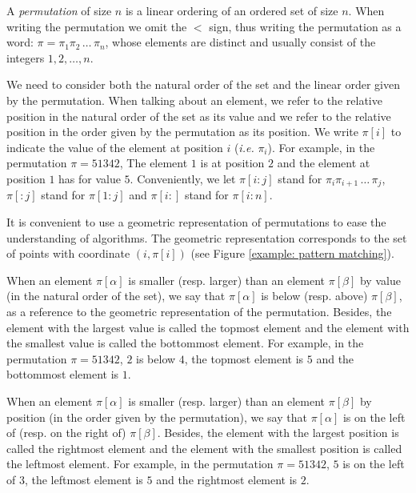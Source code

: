 \documentclass[a4paper]{llncs}
\DeclareMathOperator{\RED}{red}
\begin{document}
A \textit{permutation} of size $n$ is a linear ordering of an ordered set of size $n$.
When writing the permutation we omit the $<$ sign, thus
writing the permutation as a word:
$\pi = \pi_1\pi_2\,\ldots\,\pi_n$, whose elements are distinct
and usually consist of the integers $1,2,\ldots,n$.

We need to consider both the natural order of the set
and the linear order given by the permutation.
When talking about an element,
we refer to the relative position in
the natural order of the set
as its value
and
we refer to the relative position
in the order given by the permutation
as its position.
We write
$\pi[i]$ to indicate the value of the element
at position $i$ (\emph{i.e.} $\pi_i$).
For example, in the permutation $\pi = 51342$,
The element $1$ is at position $2$
and the element at position $1$ has for value $5$.
Conveniently, we let
$\pi[i:j]$ stand for
$\pi_i\pi_{i+1}\,\ldots\,\pi_j$,
$\pi[:j]$ stand for $\pi[1:j]$ and
$\pi[i:]$ stand for $\pi[i:n]$.

It is convenient to use a geometric representation of permutations
to ease the understanding of algorithms.
The geometric representation corresponds to the set of points with coordinate $(i,\pi[i])$
(see Figure \ref{example: pattern matching}).


When an element $\pi[\alpha]$ is smaller (resp. larger)
than an element $\pi[\beta]$  by value (in the natural order of the set),
we say that $\pi[\alpha]$ is below (resp. above) $\pi[\beta]$,
as a reference to the geometric representation of the permutation.
Besides, the element with the largest value is called
the topmost element and the element with the smallest value
is called the bottommost element.
For example, in the permutation $\pi = 51342$,
$2$ is below $4$, the topmost element is $5$
and the bottommost element is $1$.

When an element $\pi[\alpha]$ is smaller (resp. larger)
than an element $\pi[\beta]$  by position (in the order given by the permutation),
we say that $\pi[\alpha]$ is on the left of (resp. on the right of) $\pi[\beta]$.
Besides, the element with the largest position is called the rightmost element
and the element with the smallest position is called the leftmost element.
For example, in the permutation $\pi = 51342$,
$5$ is on the left of $3$, the leftmost element is $5$
and the rightmost element is $2$.


\end{document}
